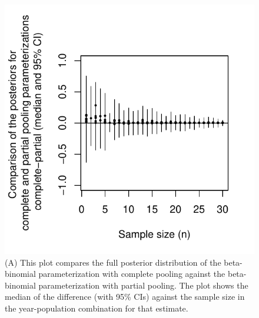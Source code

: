 \documentclass[12pt, oneside, titlepage]{article}   	%
\begin{document}
 \begin{figure}[h]
   \centering
       \includegraphics[page=1,width=.9\textwidth]{../figures/appendix-x-bayescomp_bayeshier}  
    \caption{ (A) This plot compares the full posterior distribution of the beta-binomial parameterization with complete pooling against the beta-binomial parameterization with partial pooling. The plot shows the median of the difference (with 95\% CIs) against the sample size in the year-population combination for that estimate.  }
 \label{fig:complete_vs_partial}
\end{figure}
\end{document}
